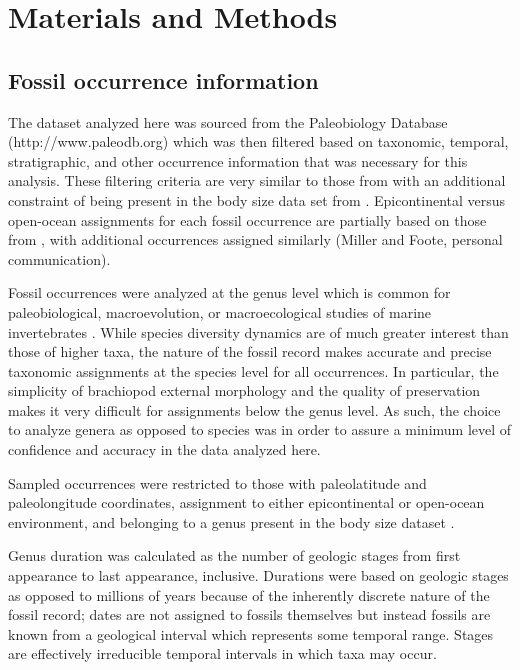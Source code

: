 \documentclass[12pt,letterpaper]{article}
\begin{document}
\section{Materials and Methods}

\subsection{Fossil occurrence information}

The dataset analyzed here was sourced from the Paleobiology Database (http://www.paleodb.org) which was then filtered based on taxonomic, temporal, stratigraphic, and other occurrence information that was necessary for this analysis. These filtering criteria are very similar to those from \citet{Foote2013} with an additional constraint of being present in the body size data set from \citet{Payne2014}. Epicontinental versus open-ocean assignments for each fossil occurrence are partially based on those from \citet{Miller2009a}, with additional occurrences assigned similarly (Miller and Foote, personal communication).

Fossil occurrences were analyzed at the genus level which is common for paleobiological, macroevolution, or macroecological studies of marine invertebrates \citep{Alroy2010,Foote2013,Harnik2013,Kiessling2007a,Miller2009a,Nurnberg2013a,Nurnberg2015,Payne2007,Simpson2009,Vilhena2013}. While species diversity dynamics are of much greater interest than those of higher taxa, the nature of the fossil record makes accurate and precise taxonomic assignments at the species level for all occurrences. In particular, the simplicity of brachiopod external morphology and the quality of preservation makes it very difficult for assignments below the genus level. As such, the choice to analyze genera as opposed to species was in order to assure a minimum level of confidence and accuracy in the data analyzed here.

Sampled occurrences were restricted to those with paleolatitude and paleolongitude coordinates, assignment to either epicontinental or open-ocean environment, and belonging to a genus present in the body size dataset \citep{Payne2014}. 

Genus duration was calculated as the number of geologic stages from first appearance to last appearance, inclusive. Durations were based on geologic stages as opposed to millions of years because of the inherently discrete nature of the fossil record; dates are not assigned to fossils themselves but instead fossils are known from a geological interval which represents some temporal range. Stages are effectively irreducible temporal intervals in which taxa may occur.
\end{document}
